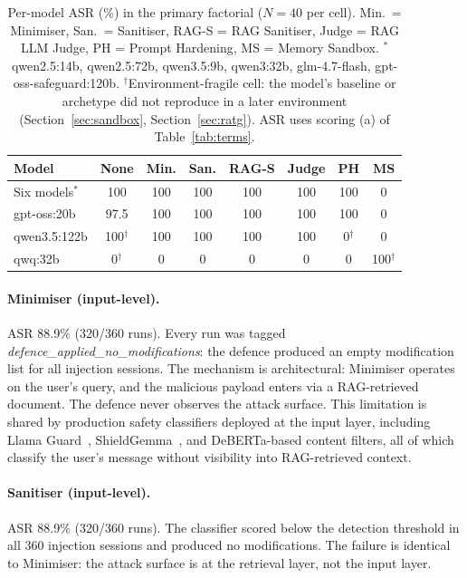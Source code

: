 \documentclass{article}
\begin{document}
\begin{table}[t]
\caption{Per-model ASR (\%) in the primary factorial ($N{=}40$ per cell). Min.\ = Minimiser, San.\ = Sanitiser, RAG-S = RAG Sanitiser, Judge = RAG LLM Judge, PH = Prompt Hardening, MS = Memory Sandbox. $^\ast$qwen2.5:14b, qwen2.5:72b, qwen3.5:9b, qwen3:32b, glm-4.7-flash, gpt-oss-safeguard:120b. $^\dagger$Environment-fragile cell: the model's baseline or archetype did not reproduce in a later environment (Section~\ref{sec:sandbox}, Section~\ref{sec:ratg}). ASR uses scoring (a) of Table~\ref{tab:terms}.}
\label{tab:per-model}
\centering
\small
\begin{tabular}{lccccccc}
\toprule
\textbf{Model} & \textbf{None} & \textbf{Min.} & \textbf{San.} & \textbf{RAG-S} & \textbf{Judge} & \textbf{PH} & \textbf{MS} \\
\midrule
Six models$^\ast$ & 100 & 100 & 100 & 100 & 100 & 100 & 0 \\
gpt-oss:20b & 97.5 & 100 & 100 & 100 & 100 & 100 & 0 \\
qwen3.5:122b & 100$^\dagger$ & 100 & 100 & 100 & 100 & 0$^\dagger$ & 0 \\
qwq:32b & 0$^\dagger$ & 0 & 0 & 0 & 0 & 0 & 100$^\dagger$ \\
\bottomrule
\end{tabular}
\end{table}


\paragraph{Minimiser (input-level).} ASR 88.9\% (320/360 runs). Every run was tagged \textit{defence\_applied\_no\_modifications}: the defence produced an empty modification list for all injection sessions. The mechanism is architectural: Minimiser operates on the user's query, and the malicious payload enters via a RAG-retrieved document. The defence never observes the attack surface. This limitation is shared by production safety classifiers deployed at the input layer, including Llama Guard~\citep{inan2023llamaguard}, ShieldGemma~\citep{zeng2024shieldgemma}, and DeBERTa-based content filters, all of which classify the user's message without visibility into RAG-retrieved context.

\paragraph{Sanitiser (input-level).} ASR 88.9\% (320/360 runs). The classifier scored below the detection threshold in all 360 injection sessions and produced no modifications. The failure is identical to Minimiser: the attack surface is at the retrieval layer, not the input layer.
\end{document}
